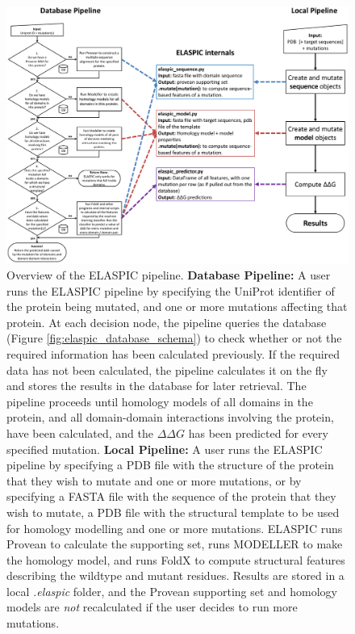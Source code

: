 \begin{figure}[!tb]
	\centering
	\includegraphics[width=1.0\textwidth]{static/elaspic/elaspic_flowchart.pdf}
	\caption[ELASPIC pipeline.]{Overview of the ELASPIC pipeline. \textbf{Database Pipeline:} A user runs the ELASPIC pipeline by specifying the UniProt identifier of the protein being mutated, and one or more mutations affecting that protein. At each decision node, the pipeline queries the database (Figure \ref{fig:elaspic_database_schema}) to check whether or not the required information has been calculated previously. If the required data has not been calculated, the pipeline calculates it on the fly and stores the results in the database for later retrieval. The pipeline proceeds until homology models of all domains in the protein, and all domain-domain interactions involving the protein, have been calculated, and the $\Delta \Delta G$ has been predicted for every specified mutation. \textbf{Local Pipeline:} A user runs the ELASPIC pipeline by specifying a PDB file with the structure of the protein that they wish to mutate and one or more mutations, or by specifying a FASTA file with the sequence of the protein that they wish to mutate, a PDB file with the structural template to be used for homology modelling and one or more mutations. ELASPIC runs Provean to calculate the supporting set, runs MODELLER to make the homology model, and runs FoldX to compute structural features describing the wildtype and mutant residues. Results are stored in a local \textit{.elaspic} folder, and the Provean supporting set and homology models are \textit{not} recalculated if the user decides to run more mutations.}
	\label{fig:elaspic_pipeline}
\end{figure}


